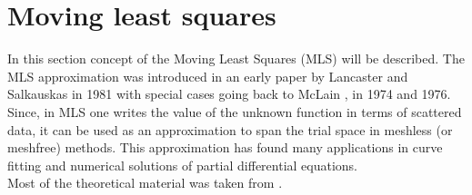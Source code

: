 \section{Moving least squares}
In this section concept of the Moving Least Squares (MLS) will be described. The MLS approximation was introduced in an early paper by Lancaster and Salkauskas  \cite{MLSSalkauskas} in 1981 with special cases going back to McLain  \cite{MLSMcLain1}, \cite{MLSMcLain2} in 1974 and 1976. Since, in MLS one writes the value of the unknown function in terms of scattered data, it can be used as an approximation to span the trial space in meshless (or meshfree) methods. This approximation has found many applications in curve fitting and numerical solutions of partial differential equations.\\
Most of the theoretical material was taken from \cite{MLSIntro}.
